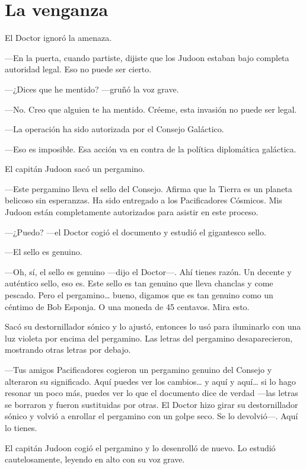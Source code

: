 \chapter*{La venganza}

El Doctor ignoró la amenaza.

---En la puerta, cuando partiste, dijiste que los Judoon estaban bajo
completa autoridad legal. Eso no puede ser cierto.

---¿Dices que he mentido? ---gruñó la voz grave.

---No. Creo que alguien te ha mentido. Créeme, esta invasión no puede
ser legal.

---La operación ha sido autorizada por el Consejo Galáctico.

---Eso es imposible. Esa acción va en contra de la política diplomática
galáctica.

El capitán Judoon sacó un pergamino.

---Este pergamino lleva el sello del Consejo. Afirma que la Tierra es un
planeta belicoso sin esperanzas. Ha sido entregado a los Pacificadores
Cósmicos. Mis Judoon están completamente autorizados para asistir en
este proceso.

---¿Puedo? ---el Doctor cogió el documento y estudió el gigantesco
sello.

---El sello es genuino.

---Oh, sí, el sello es genuino ---dijo el Doctor---. Ahí tienes razón.
Un decente y auténtico sello, eso es. Este sello es tan genuino que
lleva chanclas y come pescado. Pero el pergamino\ldots{} bueno, digamos
que es tan genuino como un céntimo de Bob Esponja. O una moneda de 45
centavos. Mira esto.

Sacó su destornillador sónico y lo ajustó, entonces lo usó para
iluminarlo con una luz violeta por encima del pergamino. Las letras del
pergamino desaparecieron, mostrando otras letras por debajo.

---Tus amigos Pacificadores cogieron un pergamino genuino del Consejo y
alteraron su significado. Aquí puedes ver los cambios\ldots{} y aquí y
aquí\ldots{} si lo hago resonar un poco más, puedes ver lo que el
documento dice de verdad ---las letras se borraron y fueron sustituidas
por otras. El Doctor hizo girar su destornillador sónico y volvió a
enrollar el pergamino con un golpe seco. Se lo devolvió---. Aquí lo
tienes.

El capitán Judoon cogió el pergamino y lo desenrolló de nuevo. Lo
estudió cautelosamente, leyendo en alto con su voz grave.

